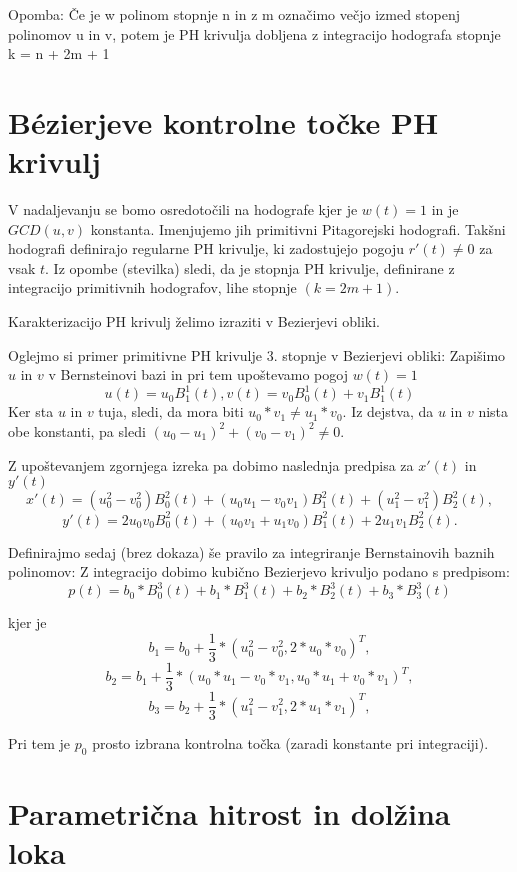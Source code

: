 \documentclass[12pt]{article}
\begin{document}
Opomba:
Če je w polinom stopnje n in z m označimo večjo izmed stopenj polinomov u in v, 
potem je PH krivulja dobljena z integracijo hodografa stopnje k = n + 2m + 1

\section{B\'ezierjeve kontrolne točke PH krivulj}
V nadaljevanju se bomo osredotočili na hodografe kjer je $w(t) = 1$ in je $GCD(u,v)$ konstanta.
Imenjujemo jih primitivni Pitagorejski hodografi. 
Takšni hodografi definirajo regularne PH krivulje, ki zadostujejo pogoju $r'(t) \neq 0$ za vsak $t$. 
Iz opombe (stevilka) sledi, da je stopnja PH krivulje, definirane z integracijo
primitivnih hodografov, lihe stopnje $(k = 2m + 1)$.

Karakterizacijo PH krivulj želimo izraziti v Bezierjevi obliki.

Oglejmo si primer primitivne PH krivulje 3. stopnje v Bezierjevi obliki:
Zapišimo $u$ in $v$ v Bernsteinovi bazi in pri tem upoštevamo pogoj $w(t) = 1$
$$u(t) = u_0 B^1_1(t), v(t) = v_0 B^1_0(t) + v_1 B^1_1(t)$$
Ker sta $u$ in $v$ tuja, sledi, da mora biti $u_0*v_1 \neq u_1*v_0$. Iz dejstva, da
$u$ in $v$ nista obe konstanti, pa sledi $(u_0 - u_1)^2 + (v_0 - v_1)^2 \neq 0$.

Z upoštevanjem zgornjega izreka pa dobimo naslednja predpisa za $x'(t)$ in $y'(t)$
$$x'(t) = (u_0^2 - v_0^2) B_0^2(t) + (u_0 u_1 - v_0 v_1) B_1^2(t) + (u_1^2 - v_1^2) B_2^2(t),$$
$$y'(t) = 2 u_0 v_0 B_0^2(t) + (u_0 v_1 + u_1 v_0) B_1^2(t) + 2 u_1 v_1 B_2^2(t).$$

Definirajmo sedaj (brez dokaza) še pravilo za integriranje Bernstainovih baznih polinomov:
Z integracijo dobimo kubično Bezierjevo krivuljo podano s predpisom:
$$p(t) = b_0*B_0^3(t) + b_1*B_1^3(t) + b_2*B_2^3(t) + b_3*B_3^3(t)$$

kjer je
$$b_1 = b_0 + \frac{1}{3}*(u_0^2 - v_0^2, 2*u_0*v_0)^T,$$
$$b_2 = b_1 + \frac{1}{3}*(u_0*u_1 - v_0*v_1, u_0*u_1 + v_0*v_1)^T,$$
$$b_3 = b_2 + \frac{1}{3}*(u_1^2 - v_1^2, 2*u_1*v_1)^T,$$

Pri tem je $p_0$ prosto izbrana kontrolna točka (zaradi konstante pri integraciji).

\section*{Parametrična hitrost in dolžina loka}
\end{document}

